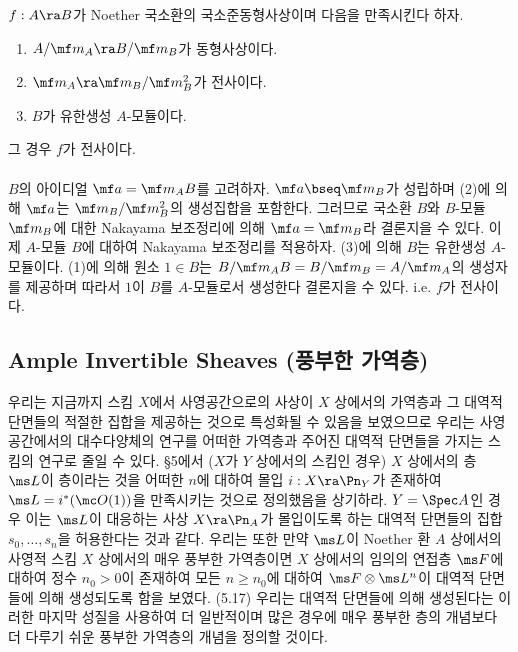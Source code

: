 	
	\begin{lemma}
	$f:A\ra B$가 Noether 국소환의 국소준동형사상이며 다음을 만족시킨다 하자.
	\begin{enumerate}[label=(\arabic*)]
	\item $A/\mf m_A\ra B/\mf m_B$가 동형사상이다.
	\item $\mf m_A\ra\mf m_B/\mf m_B^2$가 전사이다.
	\item $B$가 유한생성 $A$-모듈이다.
	\end{enumerate}
	그 경우 $f$가 전사이다.\\\\
	\pf $B$의 아이디얼 $\mf a=\mf m_AB$를 고려하자.
	$\mf a\bseq\mf m_B$가 성립하며 (2)에 의해 $\mf a$는 $\mf m_B/\mf m_B^2$의 생성집합을 포함한다.
	그러므로 국소환 $B$와 $B$-모듈 $\mf m_B$에 대한 Nakayama 보조정리에 의해 $\mf a=\mf m_B$라 결론지을 수 있다.
	이제 $A$-모듈 $B$에 대하여 Nakayama 보조정리를 적용하자. (3)에 의해 $B$는 유한생성 $A$-모듈이다.
	(1)에 의해 원소 $1\in B$는 $B/\mf m_AB=B/\mf m_B=A/\mf m_A$의 생성자를 제공하며
	따라서 $1$이 $B$를 $A$-모듈로서 생성한다 결론지을 수 있다. i.e. $f$가 전사이다.
	\end{lemma}
	
	
	\subsection*{Ample Invertible Sheaves (풍부한 가역층)}
	우리는 지금까지 스킴 $X$에서 사영공간으로의 사상이 $X$ 상에서의 가역층과
	그 대역적 단면들의 적절한 집합을 제공하는 것으로 특성화될 수 있음을 보였으므로
	우리는 사영공간에서의 대수다양체의 연구를 어떠한 가역층과 주어진 대역적 단면들을 가지는 스킴의 연구로 줄일 수 있다.
	\S 5에서 ($X$가 $Y$ 상에서의 스킴인 경우) $X$ 상에서의 층 $\ms L$이
	 층이라는 것을
	어떠한 $n$에 대하여 몰입 $i:X\ra\Pn_Y$가 존재하여 $\ms L=i^*(\mc O(1))$을 만족시키는 것으로 정의했음을 상기하라.
	$Y=\Spec A$인 경우 이는 $\ms L$이 대응하는 사상 $X\ra\Pn_A$가 몰입이도록 하는
	대역적 단면들의 집합 $s_0,\ldots,s_n$을 허용한다는 것과 같다.
	우리는 또한 만약 $\ms L$이 Noether 환 $A$ 상에서의 사영적 스킴 $X$ 상에서의 매우 풍부한 가역층이면
	$X$ 상에서의 임의의 연접층 $\ms F$에 대하여 정수 $n_0>0$이 존재하여
	모든 $n\ge n_0$에 대하여 $\ms F\otimes\ms L^n$이 대역적 단면들에 의해 생성되도록 함을 보였다. (5.17)
	우리는 대역적 단면들에 의해 생성된다는 이러한 마지막 성질을 사용하여 더 일반적이며
	많은 경우에 매우 풍부한 층의 개념보다 더 다루기 쉬운 풍부한 가역층의 개념을 정의할 것이다.
	
